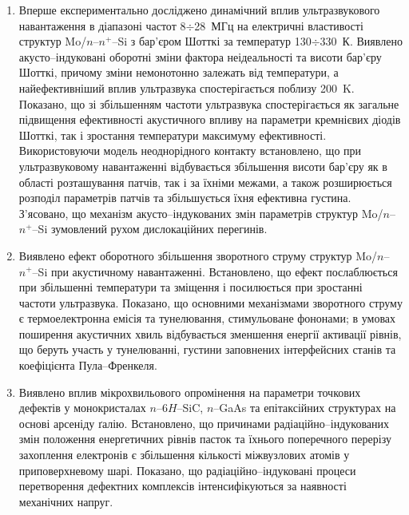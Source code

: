 \begin{enumerate}[leftmargin=0cm,itemindent=3em]
\item
Вперше експериментально досліджено динамічний вплив ультразвукового навантаження в діапазоні частот 8$\div$28~МГц на електричні властивості структур Mo/$n$--$n^{+}$--Si з бар'єром Шотткі за температур 130$\div$330~К.
 Виявлено акусто--індуковані оборотні зміни фактора неідеальності та висоти бар'єру Шотткі, причому зміни немонотонно залежать від температури, а найефективніший вплив ультразвука спостерігається поблизу 200~K.
  Показано, що зі збільшенням частоти ультразвука  спостерігається як загальне підвищення ефективності акустичного впливу на параметри кремнієвих діодів Шотткі,
так і зростання температури максимуму ефективності.
 Використовуючи модель неоднорідного контакту встановлено, що при ультразвуковому навантаженні відбувається збільшення висоти бар'єру як в області розташування патчів, так і за їхніми межами, а також розширюється розподіл параметрів патчів та збільшується їхня ефективна густина.
З'ясовано, що механізм акусто--індукованих змін параметрів структур Mo/$n$--$n^{+}$--Si зумовлений рухом дислокаційних перегинів.

\item Виявлено ефект оборотного збільшення зворотного струму структур Mo/$n$--$n^{+}$--Si при акустичному навантаженні.
Встановлено, що ефект послаблюється при збільшенні температури та зміщення і посилюється при зростанні частоти ультразвука.
Показано, що основними механізмами зворотного струму є термоелектронна емісія та тунелювання, стимульоване фононами;
в умовах поширення акустичних хвиль відбувається зменшення енергії активації рівнів, що беруть участь у тунелюванні,
густини заповнених інтерфейсних станів та коефіцієнта Пула--Френкеля.

\item Виявлено вплив мікрохвильового опромінення на параметри точкових дефектів у монокристалах $n$--6$H$--SiC, $n$--GaAs та епітаксійних структурах на основі арсеніду ґалію.
Встановлено, що причинами радіаційно--індукованих змін 
положення енергетичних рівнів пасток  та їхнього поперечного перерізу захоплення електронів 
є збільшення кількості міжвузлових атомів у приповерхневому шарі.
Показано, що радіаційно--індуковані процеси перетворення дефектних комплексів інтенсифікуються за наявності механічних напруг.


\end{enumerate}
